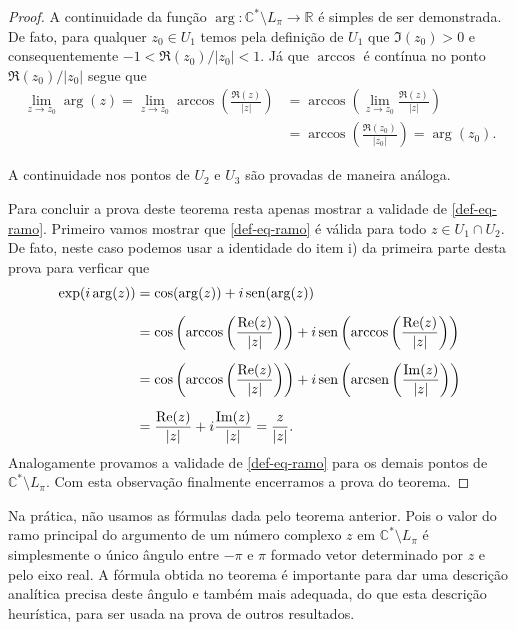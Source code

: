\begin{proof}
A continuidade da função $\arg:\mathbb{C}^{*}\setminus L_{\pi}\to \mathbb{R}$
é simples de ser demonstrada. De fato, para qualquer $z_0\in U_1$ temos pela definição  
de $U_1$ que $\Im(z_0)>0$ e consequentemente $-1<\Re(z_0)/|z_0|<1$. Já que  
$\arccos$ é contínua no ponto $\Re(z_0)/|z_0|$ segue que
\begin{align*}
\lim_{z\to z_0}\arg(z) 
= 
\lim_{z\to z_0} \arccos\left( \displaystyle\frac{\Re(z)}{|z|} \right)
&=
\arccos\left( \lim_{z\to z_0}\displaystyle\frac{\Re(z)}{|z|} \right)
\\[0.2cm]
&=
\arccos\left( \displaystyle\frac{\Re(z_0)}{|z_0|} \right)
=
\arg(z_0).
\end{align*}

A continuidade nos pontos de $U_2$ e $U_3$ são provadas de maneira análoga.

Para concluir a prova deste teorema resta apenas mostrar a validade de
\eqref{def-eq-ramo}. Primeiro vamos mostrar que \eqref{def-eq-ramo} é 
válida para todo $z\in U_1\cap U_2$. De fato, neste caso podemos usar a 
identidade do item i) da primeira parte desta prova para verficar que 
\begin{align*}
\exp(i\arg(z))
&=
\cos( \arg(z))+i\operatorname{sen} (\arg(z))
\\[0.2cm]
&
=
\cos\left( \arccos\left( \displaystyle\frac{\mathrm{Re}(z)}{|z|} \right) \right)
+
i\operatorname{sen} \left( \arccos\left( \displaystyle\frac{\mathrm{Re}(z)}{|z|} \right) \right)
\\[0.2cm]
&
=
\cos\left( \arccos\left( \displaystyle\frac{\mathrm{Re}(z)}{|z|} \right) \right)
+
i\operatorname{sen} \left( \operatorname{arcsen}\left( \displaystyle\frac{\mathrm{Im}(z)}{|z|} \right) \right)
\\[0.2cm]
&=
\frac{\mathrm{Re}(z)}{|z|}+i \frac{\mathrm{Im}(z)}{|z|} 
=
\frac{z}{|z|}.
\end{align*}
Analogamente provamos a validade de \eqref{def-eq-ramo}
para os demais pontos de $\mathbb{C}^{*}\setminus L_{\pi}$. 
Com esta observação finalmente encerramos a prova do teorema.
\end{proof}

\bigskip 

Na prática, não usamos as fórmulas dada pelo teorema anterior. Pois o 
valor do ramo principal do argumento de um número complexo $z$ em 
$\mathbb{C}^{*}\setminus L_{\pi}$ é simplesmente o único ângulo entre $-\pi$
e $\pi$ formado vetor determinado por $z$ e pelo eixo real.
A fórmula obtida no teorema é importante para dar uma descrição analítica
precisa deste ângulo e também mais adequada, do que esta descrição 
heurística, para ser usada na prova de outros resultados. 




